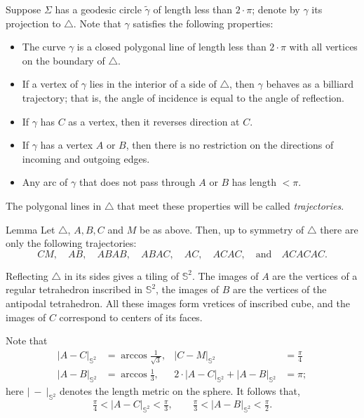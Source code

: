 \documentclass[a4paper,10pt]{article}
\begin{document}
Suppose $\Sigma$ has a geodesic circle $\tilde \gamma$ of length less than $2\cdot\pi$;
denote by $\gamma$ its projection to $\triangle$.
Note that $\gamma$ satisfies the following properties:
\begin{itemize}
\item The curve $\gamma$ is a closed polygonal line of length less than $2\cdot\pi$ with all vertices on the boundary of $\triangle$.
\item If a vertex of $\gamma$ lies in the interior of a side of $\triangle$, then $\gamma$ behaves as a billiard trajectory; that is, the angle of incidence is equal to the angle of reflection.
\item If $\gamma$ has $C$ as a vertex, then it reverses direction at $C$.
\item If $\gamma$ has a vertex $A$ or $B$, then there is no restriction on the directions of incoming and outgoing edges.
\item Any arc of $\gamma$ that does not pass through $A$ or $B$ has length $<\pi$.
\end{itemize}
The polygonal lines in $\triangle$ that meet these properties will be called \emph{trajectories}.

\begin{thm}{Lemma}\label{lem:short-trajectories}
Let $\triangle$, $A,B,C$ and $M$ be as above.
Then, up to symmetry of $\triangle$ there are only the following trajectories:
\[CM,\quad AB,\quad ABAB,\quad ABAC,\quad AC,\quad ACAC,\quad \text{and}\quad ACACAC.\]

\end{thm}

Reflecting $\triangle$ in its sides gives a tiling of $\mathbb{S}^2$.
The images of $A$ are the vertices of a regular tetrahedron inscribed in $\mathbb{S}^2$,
the images of $B$ are the vertices of the antipodal tetrahedron.
All these images form vretices of inscribed cube,
and the images of $C$ correspond to centers of its faces.

Note that
\begin{align*}
|A-C|_{\mathbb{S}^2}&=\arccos\tfrac1{\sqrt3}, &
|C-M|_{\mathbb{S}^2}&=\tfrac\pi4
\\
|A-B|_{\mathbb{S}^2}&=\arccos\tfrac13, &
2\cdot|A-C|_{\mathbb{S}^2}+|A-B|_{\mathbb{S}^2}&=\pi;
\end{align*}
here $|\ -\ |_{\mathbb{S}^2}$ denotes the length metric on the sphere.
It follows that,
\[
\tfrac\pi4<|A-C|_{\mathbb{S}^2}<\tfrac\pi3,
\qquad
\tfrac\pi3<|A-B|_{\mathbb{S}^2}<\tfrac\pi2.
\]
\end{document}
